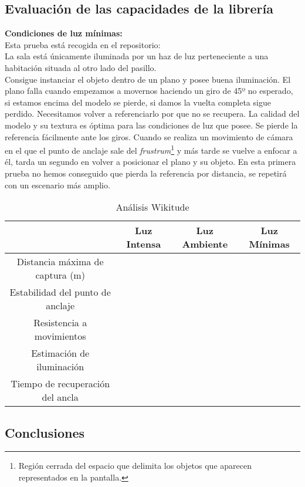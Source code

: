 \subsection{Evaluación de las capacidades de la librería}
\textbf{Condiciones de luz mínimas:}\\
Esta prueba está recogida en el repositorio:\\
La sala está únicamente iluminada por un haz de luz perteneciente a una habitación situada al otro lado del pasillo.\\

Consigue instanciar el objeto dentro de un plano y posee buena iluminación. El plano falla cuando empezamos a movernos haciendo un giro de 45º no esperado, si estamos encima del modelo se pierde, si damos la vuelta completa sigue perdido. Necesitamos volver a referenciarlo por que no se recupera. La calidad del modelo y su textura es óptima para las condiciones de luz que posee. Se pierde la referencia fácilmente ante los giros. Cuando se realiza un movimiento de cámara en el que el punto de anclaje sale del \textit{frustrum}\footnote{Región cerrada del espacio que delimita los objetos que aparecen representados en la pantalla.}  y más tarde se vuelve a enfocar a él, tarda un segundo en volver a posicionar el plano y su objeto. En esta primera prueba no hemos conseguido que pierda la referencia por distancia, se repetirá con un escenario más amplio.

\begin{table}[H]
\resizebox{\textwidth}{!} {
    \centering
    \begin{tabular}{|c|c|c|c|}
    \hline
         & Luz Intensa & Luz Ambiente & Luz Mínimas \\
         \hline
        Distancia máxima de captura (m) & & &\\
        \hline
        Estabilidad del punto de anclaje & & &\\
        \hline
        Resistencia a movimientos & & & \\
        \hline
        Estimación de iluminación & & & \\
        \hline
        Tiempo de recuperación del ancla & & & \\
      \hline
    \end{tabular}
  }
    \caption{Análisis Wikitude}
    \label{tab:TWikitude}
\end{table}

\subsection{Conclusiones}

